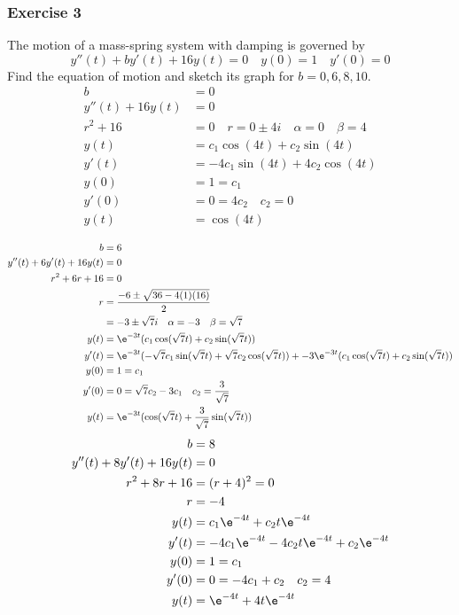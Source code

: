 \documentclass{math}
\begin{document}
\subsubsection*{Exercise 3}
The motion of a mass-spring system with damping is governed by
\[ y''(t)+by'(t)+16y(t) = 0 \quad y(0) = 1 \quad y'(0) = 0 \]
Find the equation of motion and sketch its graph for \( b = 0,6,8,10 \). \\
\begin{align*}
  b &= 0 \\
  y''(t)+16y(t) &= 0 \\
  r^2+16 &= 0 \quad r = 0\pm4i \quad \alpha = 0 \quad \beta = 4 \\
  y(t) &= c_1\cos(4t)+c_2\sin(4t) \\
  y'(t) &= -4c_1\sin(4t)+4c_2\cos(4t) \\
  y(0) &= 1 = c_1 \\
  y'(0) &= 0 = 4c_2 \quad c_2 = 0 \\
  y(t) &= \cos(4t) \\
\end{align*}
\begin{align*}
  b &= 6 \\
  y''(t)+6y'(t)+16y(t) &= 0 \\
  r^2+6r+16 &= 0 \\
  r &= \frac{-6\pm\sqrt{36-4(1)(16)}}{2} \\
  &= -3\pm\sqrt{7}i \quad \alpha = -3 \quad \beta = \sqrt{7} \\
  y(t) &= \e^{-3t}(c_1\cos(\sqrt{7}t)+c_2\sin(\sqrt{7}t)) \\
  y'(t) &= \e^{-3t}(-\sqrt{7}c_1\sin(\sqrt{7}t)+\sqrt{7}c_2\cos(\sqrt{7}t))+
    -3\e^{-3t}(c_1\cos(\sqrt{7}t)+c_2\sin(\sqrt{7}t)) \\
  y(0) &= 1 = c_1 \\
  y'(0) &= 0 = \sqrt{7}c_2-3c_1 \quad c_2 = \frac{3}{\sqrt{7}} \\
  y(t) &= \e^{-3t}(\cos(\sqrt{7}t)+\frac{3}{\sqrt{7}}\sin(\sqrt{7}t))
\end{align*}
\begin{align*}
  b &= 8 \\
  y''(t)+8y'(t)+16y(t) &= 0 \\
  r^2+8r+16 &= (r+4)^2 = 0 \\
  r &= -4 \\
  y(t) &= c_1\e^{-4t}+c_2t\e^{-4t} \\
  y'(t) &= -4c_1\e^{-4t}-4c_2t\e^{-4t}+c_2\e^{-4t} \\
  y(0) &= 1 = c_1 \\
  y'(0) &= 0 = -4c_1+c_2 \quad c_2 = 4 \\
  y(t) &= \e^{-4t}+4t\e^{-4t}
\end{align*}
\end{document}
